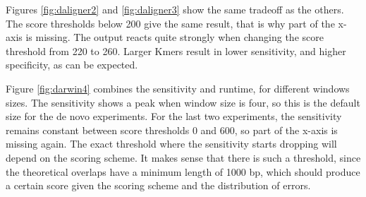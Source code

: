 \documentclass[../main/thesis.tex]{subfiles}
\begin{document}
Figures \ref{fig:daligner2} and \ref{fig:daligner3} show the same tradeoff as the others.
The score thresholds below 200 give the same result, that is why part of the x-axis is missing.
The output reacts quite strongly when changing the score threshold from 220 to 260.
Larger Kmers result in lower sensitivity, and higher specificity, as can be expected.


Figure \ref{fig:darwin4} combines the sensitivity and runtime, for different windows sizes.
The sensitivity shows a peak when window size is four, so this is the default size for the de novo experiments.
For the last two experiments, the sensitivity remains constant between score thresholds 0 and 600, so part of the x-axis is missing again.
The exact threshold where the sensitivity starts dropping will depend on the scoring scheme.
It makes sense that there is such a threshold, since the theoretical overlaps have a minimum length of 1000 bp, which should produce a certain score given the scoring scheme and the distribution of errors.
\end{document}
